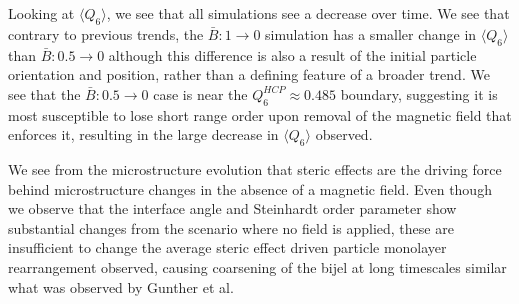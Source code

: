 Looking at \(\langle Q_6 \rangle\), we see that all simulations see a
decrease over time. We see that contrary to previous trends, the
\(\bar{B}: 1\rightarrow 0\) simulation has a smaller change in
\(\langle Q_6 \rangle\) than \(\bar{B}: 0.5\rightarrow 0\) although this
difference is also a result of the initial particle orientation and
position, rather than a defining feature of a broader trend. We see that
the \(\bar{B}: 0.5\rightarrow 0\) case is near the
\(Q_6^{HCP} \approx 0.485\) boundary, suggesting it is most susceptible
to lose short range order upon removal of the magnetic field that
enforces it, resulting in the large decrease in \(\langle Q_6 \rangle\)
observed.

We see from the microstructure evolution that steric effects are the
driving force behind microstructure changes in the absence of a magnetic
field. Even though we observe that the interface angle and Steinhardt
order parameter show substantial changes from the scenario where no
field is applied, these are insufficient to change the average steric
effect driven particle monolayer rearrangement observed, causing
coarsening of the bijel at long timescales similar what was observed by
Gunther et al.~\cite{gunther_timescales_2014}
